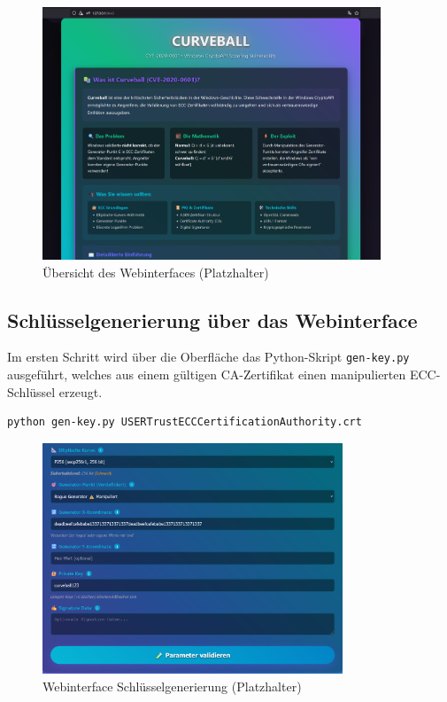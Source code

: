 \documentclass{article}
\begin{document}
\begin{figure}[h]
\centering
\includegraphics[width=0.9\textwidth]{webinterface_overview.png}
\caption{Übersicht des Webinterfaces (Platzhalter)}
\end{figure}

\subsection{Schlüsselgenerierung über das Webinterface}
Im ersten Schritt wird über die Oberfläche das Python-Skript \texttt{gen-key.py} ausgeführt, welches aus einem gültigen CA-Zertifikat einen manipulierten ECC-Schlüssel erzeugt.

\begin{lstlisting}[language=bash,caption={Schlüsselgenerierung}]
python gen-key.py USERTrustECCCertificationAuthority.crt
\end{lstlisting}

\begin{figure}[h]
\centering
\includegraphics[width=0.8\textwidth]{webinterface_keygen.png}
\caption{Webinterface Schlüsselgenerierung (Platzhalter)}
\end{figure}
\end{document}
